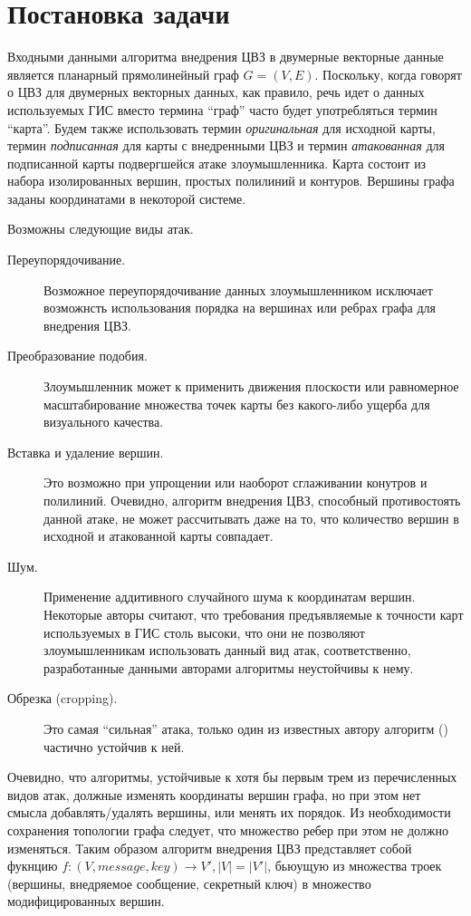 \section{Постановка задачи}
\label{sec:prob_def}

Входными данными алгоритма внедрения ЦВЗ в двумерные векторные данные является планарный прямолинейный граф $G = (V, E)$. 
Поскольку, когда говорят о ЦВЗ для двумерных векторных данных, как правило, речь идет о данных используемых ГИС 
вместо термина ``граф'' часто будет употребляться термин ``карта''. Будем также использовать термин 
\textit{оригинальная} для исходной карты, термин \textit{подписанная} для карты с внедренными 
ЦВЗ и термин \textit{атакованная} для подписанной карты подвергшейся атаке злоумышленника.
Карта состоит из набора изолированных вершин, простых полилиний и контуров.
Вершины графа заданы координатами в некоторой системе.

Возможны следующие виды атак.
\begin{description}
    \item[Переупорядочивание.] Возможное переупорядочивание данных злоумышленником исключает возможнсть 
    использования порядка на вершинах или ребрах графа для внедрения ЦВЗ.
    \item[Преобразование подобия.] Злоумышленник может к применить движения плоскости или 
    равномерное масштабирование множества точек карты без какого-либо ущерба для визуального качества. 
    \item[Вставка и удаление вершин.] Это возможно при упрощении или наоборот сглаживании конутров и полилиний. 
    Очевидно, алгоритм внедрения ЦВЗ, способный противостоять данной атаке, не может рассчитывать даже на то, что количество вершин в исходной и атакованной карты совпадает.
    \item[Шум.] Применение аддитивного случайного шума к координатам вершин. Некоторые авторы \cite{Kim, Shao, Bazin} считают, 
    что требования предъявляемые к точности карт используемых в ГИС столь высоки, что они не позволяют злоумышленникам использовать данный вид атак,
    соответственно, разработанные данными авторами алгоритмы неустойчивы к нему.
    \item[Обрезка (cropping).] Это самая ``сильная'' атака, только один из известных автору алгоритм (\cite{Ohbuchi}) частично устойчив к ней.
\end{description}  

Очевидно, что алгоритмы, устойчивые к хотя бы первым трем из перечисленных видов атак, должные изменять координаты вершин графа, но при этом нет смысла добавлять/удалять вершины, или менять их порядок. 
Из необходимости сохранения топологии графа следует, что множество ребер при этом не должно изменяться.
Таким образом алгоритм внедрения ЦВЗ представляет собой фукнцию $f: (V, message, key) \to V', |V| = |V'|$,
бьюущую из множества троек (вершины, внедряемое сообщение, секретный ключ) в множество модифицированных вершин.
